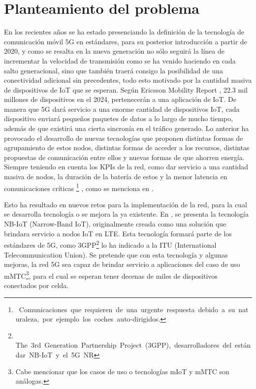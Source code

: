\section{Planteamiento del problema}

En los recientes años se ha estado presenciando la definición de la tecnología de comunicación móvil 5G en estándares, para su posterior introducción a partir de 2020, y como se resalta en \parencite{Fettweis2016} la nueva generación no sólo seguirá la línea de incrementar la velocidad de transmisión como se ha venido haciendo en cada salto generacional, sino que también traerá consigo la posibilidad de una conectividad adicional sin precedentes, todo esto motivado por la cantidad masiva de dispositivos de IoT que se esperan. Según Ericsson Mobility Report \parencite{Ericsson2019}, 22.3 mil millones de dispositivos en el 2024, pertenecerán a una aplicación de IoT. De manera que 5G dará servicio a una enorme cantidad de dispositivos IoT, cada dispositivo enviará pequeños paquetes de datos a lo largo de mucho tiempo, además de que existirá una cierta sincronía en el tráfico generado. Lo anterior ha provocado el desarrollo de nuevas tecnologías que proponen distintas formas de agrupamiento de estos nodos, distintas formas de acceder a los recursos, distintas propuestas de comunicación entre ellos y nuevas formas de que ahorren energía. Siempre teniendo en cuenta los KPIs de la red, como dar servicio a una cantidad masiva de nodos, la duración de la batería de estos y la menor latencia en comunicaciones críticas \footnote{\ Comunicaciones\ que\ requieren\ de\ una\ urgente\ respuesta\ debido\ a\ su\ naturaleza,\ por\ ejemplo\ los\ coches\ auto-dirigidos.} , como se menciona en \parencite{NGMN}.\newline

Esto ha resultado en nuevos retos para la implementación de la red, para la cual se desarrolla tecnología o se mejora la ya existente. En \parencite{GSMAssociation2019}, se presenta la tecnología NB-IoT (Narrow-Band IoT), originalmente creada como una solución que brindara servicio a nodos IoT en LTE. Esta tecnología formará parte de los estándares de 5G, como 3GPP\footnote{\ $  $The\ 3rd\ Generation\ Partnership\ Project\ (3GPP),\ desarrolladores\ del\ est\textrm{\'{a}}ndar\ NB-IoT\ y\ el\ 5G\ NR}
lo ha indicado a la ITU (International Telecommunication Union). Se pretende que con esta tecnología y algunas mejoras, la red 5G sea capaz de brindar servicio a aplicaciones del caso de uso mMTC\footnote{Cabe mencionar que los casos de uso o tecnologías mIoT y mMTC son análogas.}, para el cual se esperan tener decenas de miles de dispositivos conectados por celda. \newline

